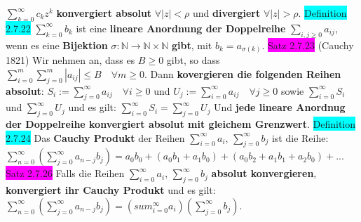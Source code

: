 \documentclass[landscape, 10pt]{article}
\newcommand{\N}{\mathbb{N}}
\begin{document}
\begin{multicols}{3}
                     \textcolor{NavyBlue}{$\sum_{k=0}^\infty c_kz^k$}
                     \textbf{konvergiert absolut} 
                     \textcolor{NavyBlue}{$\forall |z|<\rho$} und \textbf{divergiert} 
                     \textcolor{NavyBlue}{$\forall |z|>\rho$}.
              \colorbox{cyan}{Definition 2.7.22} \textcolor{NavyBlue}{$\sum_{k=0}^\infty b_k$}
                     ist eine \textbf{lineare Anordnung der Doppelreihe} 
                     \textcolor{NavyBlue}{$\sum_{i,j\geqslant0}a_{ij}$}, wenn es eine 
                     \textbf{Bijektion} 
                     \textcolor{NavyBlue}{$\sigma:\N\longrightarrow\N\times\N$}
                     \textbf{gibt}, mit \textcolor{NavyBlue}{$b_k=a_{\sigma(k)}$}.
              \colorbox{magenta}{Satz 2.7.23} (Cauchy 1821) Wir nehmen an, dass es 
                     \textcolor{NavyBlue}{$B\geqslant0$} gibt, so dass 
                     \textcolor{NavyBlue}{
                     $\sum_{i=0}^m\sum_{j=0}^m|a_{ij}|\leqslant B\quad\forall m\geqslant0$}.
                     Dann 
                     \textbf{kovergieren die folgenden Reihen absolut}: 
                     \textcolor{NavyBlue}{$S_i:=\sum_{j=0}^\infty a_{ij}\quad\forall i\geqslant0$} 
                     und 
                     \textcolor{NavyBlue}{$U_j:=\sum_{i=0}^\infty a_{ij}\quad\forall j\geqslant0$}
                     sowie 
                     \textcolor{NavyBlue}{$\sum_{i=0}^\infty S_i$} 
                     und \textcolor{NavyBlue}{$\sum_{j=0}^\infty U_j$}
                     und es gilt: 
                     \textcolor{NavyBlue}{$\sum_{i=0}^\infty S_i=\sum_{j=0}^\infty U_j$}
                     Und \textbf{jede lineare Anordnug der Doppelreihe konvergiert 
                     absolut mit gleichem Grenzwert}.
              \colorbox{cyan}{Definition 2.7.24} Das \textbf{Cauchy Produkt} der Reihen 
                     \textcolor{NavyBlue}{$\sum_{i=0}^\infty a_i,\,\sum_{j=0}^\infty b_j$} 
                     ist die Reihe: 
                     \textcolor{NavyBlue}{$\sum_{n=0}^\infty(\sum_{j=0}^\infty a_{n-j}b_j)
                     =a_0b_0+(a_0b_1+a_1b_0)+(a_0b_2+a_1b_1+a_2b_0)+...$}
              \colorbox{magenta}{Satz 2.7.26} Falls die Reihen 
                     \textcolor{NavyBlue}{$\sum_{i=0}^\infty a_i,\,\sum_{j=0}^\infty b_j$}
                     \textbf{absolut konvergieren}, 
                     \textbf{konvergiert ihr Cauchy Produkt} und es gilt: 
                     \textcolor{NavyBlue}{$\sum_{n=0}^\infty(\sum_{j=0}^\infty a_{n-j}b_j)
                     =(sum_{i=0}^\infty a_i)(\sum_{j=0}^\infty b_j)$}.

\end{multicols}
\end{document}
